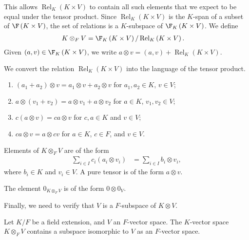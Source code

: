 \documentclass[10pt]{mypackage}
\begin{document}
\begin{definition}
\begin{enumerate}[(1)]
  \end{enumerate}
  This allows $\operatorname{Rel}_{K}\left(K\times V\right)$ to contain all such elements that we expect to be equal under the tensor product. Since $\operatorname{Rel}_{K}\left(K\times V\right)$ is the $K$-span of a subset of $\F\left(K\times V\right)$, the set of relations is a $K$-subspace of $\F_{K}\left(K\times V\right)$. We define
  \begin{align*}
    K\otimes_{F}V &= \F_{K}\left(K\times V\right)/\operatorname{Rel}_{K}\left(K\times V\right).
  \end{align*}
  Given $\left(a,v\right)\in \F_{K}\left(K\times V\right)$, we write $a\otimes v = \left(a,v\right) + \operatorname{Rel}_{K}\left(K\times V\right)$.\newline

  We convert the relation $\operatorname{Rel}_{K}\left(K\times V\right)$ into the language of the tensor product.
  \begin{enumerate}[(1)]
    \item $\left(a_1 + a_2\right)\otimes v = a_1\otimes v + a_2\otimes v$ for $a_1,a_2\in K$, $v\in V$;
    \item $a\otimes \left(v_1 + v_2\right) = a\otimes v_1 + a\otimes v_2$ for $a\in K$, $v_1,v_2\in V$;
    \item $c\left(a\otimes v\right) = ca\otimes v$ for $c,a\in K$ and $v\in V$;
    \item $ca\otimes v = a\otimes cv$ for $a\in K$, $c\in F$, and $v\in V$.
  \end{enumerate}
  Elements of $K\otimes_{F}V$ are of the form
  \begin{align*}
    \sum_{i\in I}c_i\left(a_i\otimes v_i\right) &= \sum_{i\in I}b_i\otimes v_i,
  \end{align*}
  where $b_i\in K$ and $v_i\in V$. A pure tensor is of the form $a\otimes v$.\newline

  The element $0_{K\otimes_{F}V}$ is of the form $0\otimes 0_{V}$.\newline

  Finally, we need to verify that $V$ is a $F$-subspace of $K\otimes V$.
\end{definition}
\begin{proposition}
  Let $K/F$ be a field extension, and $V$ an $F$-vector space. The $K$-vector space $K\otimes_{F}V$ contains a subspace isomorphic to $V$ as an $F$-vector space.
\end{proposition}
\end{document}

